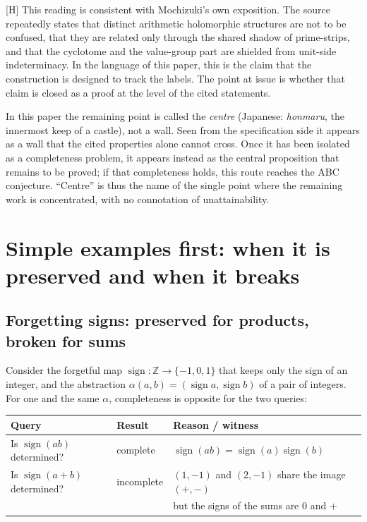 \documentclass[11pt]{article}
\theoremstyle{plain}
\theoremstyle{definition}
\theoremstyle{remark}
\newcommand{\Hmark}{\textup{[H]}}
\begin{document}
\Hmark{} This reading is consistent with Mochizuki's own
exposition.  The source repeatedly states that distinct arithmetic
holomorphic structures are not to be confused, that they are related
only through the shared shadow of prime-strips, and that the
cyclotome and the value-group part are shielded from unit-side
indeterminacy.  In the language of this paper, this is the claim
that the construction is designed to track the labels.  The point at
issue is whether that claim is closed as a proof at the level of the
cited statements.

In this paper the remaining point is called the \emph{centre}
(Japanese: \emph{honmaru}, the innermost keep of a castle), not a
wall.  Seen from the specification side it appears as a wall that
the cited properties alone cannot cross.  Once it has been isolated
as a completeness problem, it appears instead as the central
proposition that remains to be proved; if that completeness holds,
this route reaches the ABC conjecture.  ``Centre'' is thus the name
of the single point where the remaining work is concentrated, with
no connotation of unattainability.

\section{Simple examples first: when it is preserved and when it breaks}

\subsection{Forgetting signs: preserved for products, broken for sums}

Consider the forgetful map $\operatorname{sign}:\mathbb
Z\to\{-1,0,1\}$ that keeps only the sign of an integer, and the
abstraction $\alpha(a,b)=(\operatorname{sign}a,\operatorname{sign}b)$
of a pair of integers.  For one and the same $\alpha$, completeness
is opposite for the two queries:

\begin{center}
\begin{tabular}{lll}
\toprule
Query & Result & Reason / witness\\
\midrule
Is $\operatorname{sign}(ab)$ determined? & complete &
$\operatorname{sign}(ab)=\operatorname{sign}(a)\operatorname{sign}(b)$\\
Is $\operatorname{sign}(a+b)$ determined? & incomplete &
$(1,-1)$ and $(2,-1)$ share the image $(+,-)$\\
&& but the signs of the sums are $0$ and $+$\\
\bottomrule
\end{tabular}
\end{center}
\end{document}
